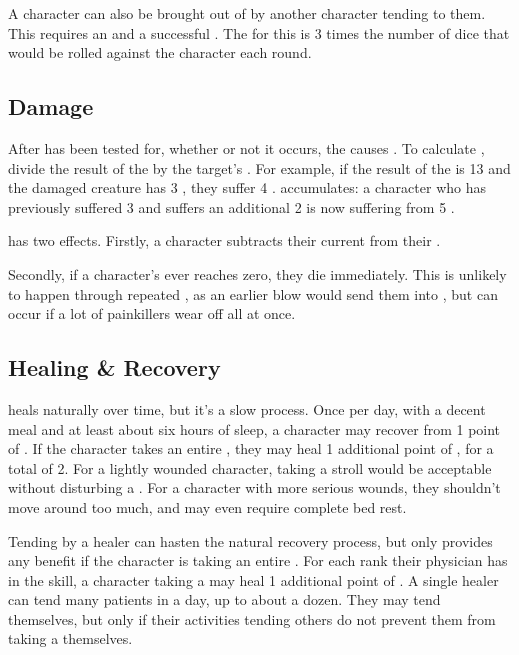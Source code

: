A character can also be brought out of {\shock} by another character tending to them.
This requires an {\action} and a successful  {\test}.
The {\tn} for this {\test} is 3 times the number of dice that would be rolled against the {\shocked} character each round.

\subsection{Damage}

After {\shock} has been tested for, whether or not it occurs, the {\damagetest} causes {\damage}.
To calculate {\damage}, divide the result of the {\damagetest} by the target's .
For example, if the result of the {\damagetest} is 13 and the damaged creature has 3 , they suffer 4 {\damage}.
{\damage} accumulates: a character who has previously suffered 3 {\damage} and suffers an additional 2 is now suffering from 5 {\damage}.

\capital{\damage} has two effects.
Firstly, a character subtracts their current {\damage} from their .

Secondly, if a character's  ever reaches zero, they die immediately.
This is unlikely to happen through repeated {\damage}, as an earlier blow would send them into {\shock}, but can occur if a lot of painkillers wear off all at once.

\subsection{Healing \& Recovery}

\capital{\damage} heals naturally over time, but it's a slow process.
Once per day, with a decent meal and at least about six hours of sleep, a character may recover from 1 point of {\damage}.
If the character takes an entire {\dayofrest}, they may heal 1 additional point of {\damage}, for a total of 2.
For a lightly wounded character, taking a stroll would be acceptable without disturbing a {\dayofrest}.
For a character with more serious wounds, they shouldn't move around too much, and may even require complete bed rest.

Tending by a healer can hasten the natural recovery process, but only provides any benefit if the character is taking an entire {\dayofrest}.
For each rank their physician has in the  skill, a character taking a {\dayofrest} may heal 1 additional point of {\damage}.
A single healer can tend many patients in a day, up to about a dozen.
They may tend themselves, but only if their activities tending others do not prevent them from taking a {\dayofrest} themselves.

